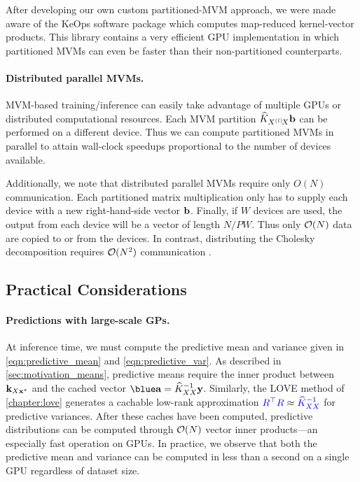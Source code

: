After developing our own custom partitioned-MVM approach, we were made aware of the KeOps software package \cite{charlier2020kernel} which computes map-reduced kernel-vector products.
This library contains a very efficient GPU implementation in which partitioned MVMs can even be faster than their non-partitioned counterparts.


\paragraph{Distributed parallel MVMs.}
MVM-based training/inference can easily take advantage of multiple GPUs or distributed computational resources.
Each MVM partition $\widehat {K}_{X^{(l)}\!X} \mathbf{b}$ can be performed on a different device.
Thus we can compute partitioned MVMs in parallel to attain wall-clock speedups proportional to the number of devices available.

Additionally, we note that distributed parallel MVMs require only $O(N)$ communication.
Each partitioned matrix multiplication only has to supply each device with a new right-hand-side vector $\mathbf{b}$.
Finally, if $W$ devices are used, the output from each device will be a vector of length $N / PW$.
Thus only $\bigo{N}$ data are copied to or from the devices.
In contrast, distributing the Cholesky decomposition requires $\bigo{N^2}$ communication \citep{nguyen2019exact}.





\subsection{Practical Considerations}

\paragraph{Predictions with large-scale GPs.}
At inference time, we must compute the predictive mean and variance given in \cref{eqn:predictive_mean} and \cref{eqn:predictive_var}.
As described in \cref{sec:motivation_means}, predictive means require the inner product between $\mathbf{k}_{X \mathbf{x}^*}$ and the cached vector $\blue \ba = \trainK^{-1} \by$.
Similarly, the LOVE method of \cref{chapter:love} generates a cachable low-rank approximation ${\color{blue} R^\top R} \approx {\color{blue} \ensuremath{\widehat{K}_{XX}}^{-1}}$ for predictive variances.
After these caches have been computed, predictive distributions can be computed through $\bigo{N}$ vector inner products---an especially fast operation on GPUs.
In practice, we observe that both the predictive mean and variance can be computed in less than a second on a single GPU regardless of dataset size.



